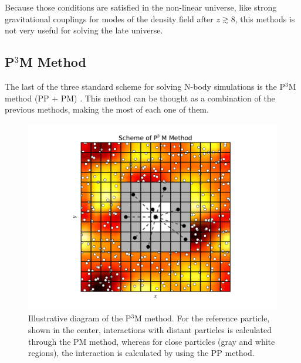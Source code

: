 Because those conditions are satisfied in the non-linear universe, like 
strong gravitational couplings for modes of the density field after 
$z\gtrsim 8$, this methods is not very useful for solving the late 
universe.



	\subsection{P$^3$M Method}
	\label{subsec:P3Method}
	
	
The last of the three standard scheme for solving N-body simulations is 
the P$^3$M method (PP $+$ PM) \cite{hockney1988}. This method can be 
thought as a combination of the previous methods, making the most of each
one of them.


\begin{figure}[htbp]
	\centering
	\includegraphics[width=1.00\textwidth]
	{./figures/3_nbody_simulations/P3M_Method.pdf}

	\caption{\small{Illustrative diagram of the P$^3$M method. For the 
	reference particle, shown in the center, interactions with distant 
	particles is calculated through the PM method, whereas for close
	particles (gray and white regions), the interaction is calculated 
	by using the PP method.}}
	
	\label{fig:P3M_Method}
\end{figure}


